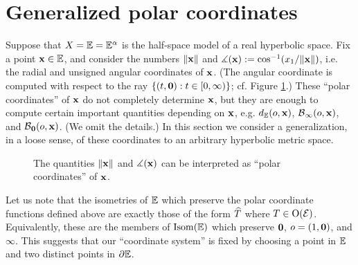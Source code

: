 \bigskip
\section{Generalized polar coordinates} \label{subsectionpolar}

Suppose that $X = \E = \E^\alpha$ is the half-space model of a real hyperbolic space. Fix a point $\xx\in\E$, and consider the numbers $\|\mathbf x\|$ and $\measuredangle(\mathbf x) := \cos^{-1}(x_1 / \|\mathbf x\|)$, i.e. the radial and unsigned angular coordinates of $\mathbf x$. (The angular coordinate is computed with respect to the ray $\{(t,\mathbf 0) : t\in{[0,\infty)}\}$; cf. Figure \ref{figurepolarcoordinates}.) These ``polar coordinates'' of $\mathbf x$ do not completely determine $\mathbf x$, but they are enough to compute certain important quantities depending on $\mathbf x$, e.g. $\dist_\E(\zero,\xx)$, $\operatorname{\mathcal B}_\infty(o,\mathbf x)$, and $\operatorname{\mathcal B}_\mathbf 0(o,\mathbf x)$. (We omit the details.) In this section we consider a generalization, in a loose sense, of these coordinates to an arbitrary hyperbolic metric space.


\begin{figure}
\begin{center}
\caption[Polar coordinates in the half-space model]{The quantities $\|\mathbf x\|$ and $\measuredangle(\mathbf x)$ can be interpreted as ``polar coordinates'' of $\mathbf x$.}
\label{figurepolarcoordinates}
\end{center}
\end{figure}

Let us note that the isometries of $\E$ which preserve the polar coordinate functions defined above are exactly those of the form $\widehat T$ where $T\in\operatorname{O}(\mathcal E)$. Equivalently, these are the members of $\Isom(\E)$ which preserve $\mathbf 0$, $o = (1,\mathbf 0)$, and $\infty$. This suggests that our ``coordinate system'' is fixed by choosing a point in $\E$ and two distinct points in $\del\E$.

